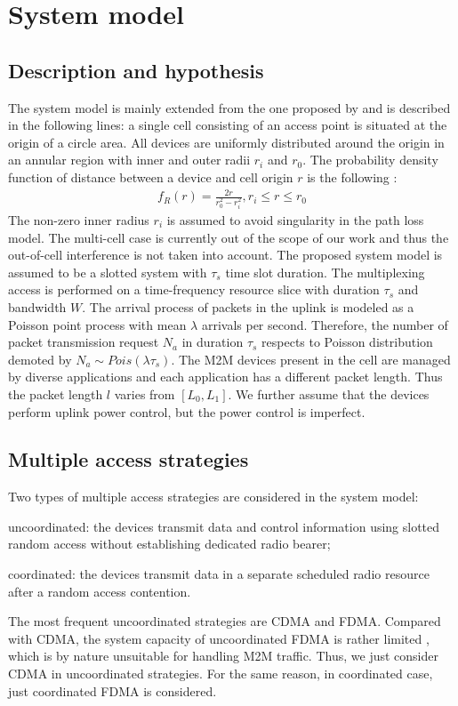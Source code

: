 \section{System model}
\label{sec:system-model}
\subsection{Description and hypothesis}
The system model is mainly extended from the one proposed by \cite{Dhi13}  and is described in the following lines: a single cell consisting of an access point is situated at the origin of a circle area. All devices are uniformly distributed around the origin in an annular region with inner and outer radii $r_{i}$ and $r_{0}$. The probability density function of distance between a device and cell origin $r$ is the following \cite{5341148}:
\begin{align}
	f_R\left( r\right) = \frac{2r}{r_0^2-r_i^2},  r_i \leq r \leq r_0
\end{align}
The non-zero inner radius $r_i$ is assumed to avoid singularity in the path loss model. The multi-cell case is currently out of the scope of our work and thus the out-of-cell interference is not taken into account. The proposed system model is assumed to be a slotted system with $\tau_s$ time slot duration. The multiplexing access is performed on a time-frequency resource slice with duration $\tau_s$ and bandwidth $W$. The arrival process of packets in the uplink is modeled as a Poisson point process with mean $\lambda$ arrivals per second. Therefore, the number of packet transmission request $N_a$ in duration $\tau_s$ respects to Poisson distribution demoted by $N_{a} \sim Pois(\lambda \tau_{s})$. The M2M devices present in the cell are managed by diverse applications and each application has a different packet length. Thus the packet length $l$ varies from $\left[L_{0}, L_{1}\right]$. We further assume that the devices perform uplink power control, but the power control is imperfect.
\subsection{Multiple access strategies}
Two types of multiple access strategies are considered in the system model: \begin{inparaenum}[i)]
	\item uncoordinated: the devices transmit data and control information using slotted random access without establishing dedicated radio bearer;
	\item coordinated: the devices transmit data in a separate scheduled radio resource after a random access contention.
\end{inparaenum}
The most frequent uncoordinated strategies are CDMA and FDMA. Compared with CDMA, the system capacity of uncoordinated FDMA is rather limited \cite{Dhi13}, which is by nature unsuitable for handling M2M traffic. Thus, we just consider CDMA in uncoordinated strategies. For the same reason, in coordinated case, just coordinated FDMA is considered.   

